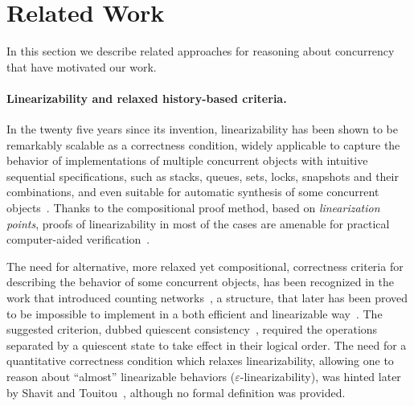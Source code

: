 
\section{Related Work}
\label{sec:related}



In this section we describe related approaches for reasoning about
concurrency that have motivated our work.

\paragraph{Linearizability and relaxed history-based criteria.}

In the twenty five years since its invention, linearizability has been
shown to be remarkably scalable as a correctness condition, widely
applicable to capture the behavior of implementations of multiple
concurrent objects with intuitive sequential specifications, such as
stacks, queues, sets, locks, snapshots and their combinations, and
even suitable for automatic synthesis of some concurrent
objects~\cite{Vechev-Yahav:PLDI08}. Thanks to the compositional proof
method, based on \emph{linearization points}, proofs of
linearizability in most of the cases are amenable for practical
computer-aided
verification~\cite{Burckhardt-al:PLDI10,Derrick-al:TOPLAS11,Vafeiadis:CAV10,Amit-al:CAV07,Shacham-al:OOPSLA11}.

The need for alternative, more relaxed yet compositional, correctness
criteria for describing the behavior of some concurrent objects, has
been recognized in the work that introduced counting
networks~\cite{Aspnes-al:JACM94}, a structure, that later has been
proved to be impossible to implement in a both efficient and
linearizable way~\cite{Herlihy-al:DC96}.
%
The suggested criterion, dubbed quiescent
consistency~\cite{Shavit-Zemah:TOPLAS96}, required the operations
separated by a quiescent state to take effect in their logical order. 
%
%
%
The need for a quantitative correctness condition which relaxes
linearizability, allowing one to reason about ``almost'' linearizable
behaviors ($\varepsilon$-linearizability), was hinted later by Shavit
and Touitou~\cite{Shavit-Touitou:SPAA95}, although no formal definition
was provided.

